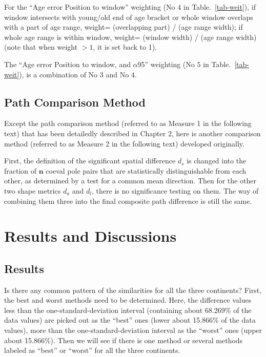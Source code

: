 For the ``Age error Position to window'' weighting (No $4$ in
Table.~\ref{tab-weit}), if window intersects with young/old end of age bracket
or whole window overlaps with a part of age range, weight= (overlapping part)
/ (age range width); if whole age range is within window, weight= (window width)
/ (age range width) (note that when weight $>1$, it is set back to 1).

The ``Age error Position to window, and $\alpha$95'' weighting (No $5$ in
Table.~\ref{tab-weit}), is a combination of No $3$ and No $4$.

\subsection{Path Comparison Method}

Except the path comparison method (referred to as Measure 1 in the following
text) that has been detailedly described in Chapter 2, here is another
comparison method (referred to as Measure 2 in the following text) developed
originally.

First, the definition of the significant spatial difference $d_s$ is changed
into the fraction of $\mathbf{n}$ coeval pole pairs that are statistically
distinguishable from each other, as determined by a test for a common mean
direction. Then for the other two shape metrics $d_a$ and $d_l$, there is no
significance testing on them. The way of combining them three into the final
composite path difference is still the same.

\section{Results and Discussions}

\subsection{Results}

Is there any common pattern of the similarities for all the three continents?
First, the best and worst methods need to be determined. Here, the difference
values less than the one-standard-deviation interval (containing about 68.269\%
of the data values) are picked out as the ``best'' ones (lower about 15.866\% of
the data values), more than the one-standard-deviation interval as the ``worst''
ones (upper about 15.866\%). Then we will see if there is one method or several
methods labeled as ``best'' or ``worst'' for all the three continents.

